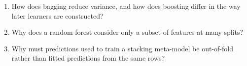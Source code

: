 \begin{quickcheck}
\begin{enumerate}
  \item How does bagging reduce variance, and how does boosting differ in the way later learners are constructed?
  \item Why does a random forest consider only a subset of features at many splits?
  \item Why must predictions used to train a stacking meta-model be out-of-fold rather than fitted predictions from the same rows?
\end{enumerate}
\end{quickcheck}
